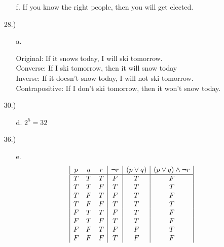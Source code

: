 \documentclass{article}
\begin{document}
\begin{enumerate}
\begin{enumerate}
\item[f.] If you know the right people, then you will get elected.

\end{enumerate}

\item[28.)]

\begin{enumerate}

\item[a.] 

Original: If it snows today, I will ski tomorrow. \\

Converse: If I ski tomorrow, then it will snow today \\

Inverse: If it doesn't snow today, I will not ski tomorrow. \\

Contrapositive: If I don't ski tomorrow, then it won't snow today.

\end{enumerate}

\item[30.)]

\begin{enumerate}

\item[d.] $2^5 = 32$

\end{enumerate}

\item[36.)]

\begin{enumerate}

\item[e.] \begin{displaymath}\begin{array}{| c c c | c | c | c|} p & q & r & \neg r & (p \vee q) & (p \vee q) \wedge \neg r \\ \hline T & T & T & F & T & F \\ T & T & F & T & T & T \\ T & F & T & F & T & F \\ T & F & F & T & T & T \\ F & T & T & F & T & F \\ F & T & F & T & T & F \\ F & F & T & F & F & T \\ F & F & F & T & F & F \end{array} \end{displaymath}

\end{enumerate}

\end{enumerate}
\end{document}
